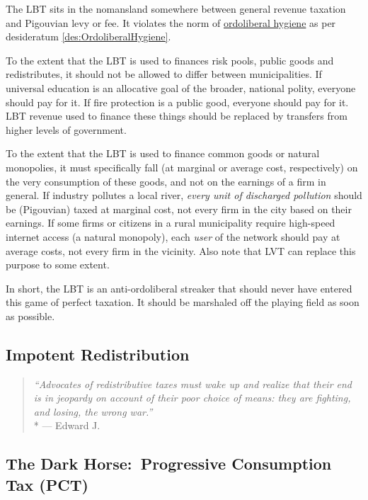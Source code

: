 The LBT sits in the nomansland somewhere between general revenue taxation and Pigouvian levy or fee.
It violates the norm of \hyperref[des:OrdoliberalHygiene]{ordoliberal hygiene} as per desideratum \ref{des:OrdoliberalHygiene}.

To the extent that the LBT is used to finances risk pools, public goods and redistributes, it should not be allowed to differ between municipalities.
If universal education is an allocative goal of the broader, national polity, everyone should pay for it.
If fire protection is a public good, everyone should pay for it.
LBT revenue used to finance these things should be replaced by transfers from higher levels of government.

To the extent that the LBT is used to finance common goods or natural monopolies, it must specifically fall (at marginal or average cost, respectively) on the very consumption of these goods, and not on the earnings of a firm in general.
If industry pollutes a local river, \emph{every unit of discharged pollution} should be (Pigouvian) taxed at marginal cost, not every firm in the city based on their earnings.
If some firms or citizens in a rural municipality require high-speed internet access (a natural monopoly), each \emph{user} of the network should pay at average costs, not every firm in the vicinity.
Also note that LVT can replace this purpose to some extent.

In short, the LBT is an anti-ordoliberal streaker that should never have entered this game of perfect taxation.
It should be marshaled off the playing field as soon as possible.

\subsection{Impotent Redistribution}

\begin{quote}
	\emph{``Advocates of redistributive taxes must wake up and realize that their end is in jeopardy on account of their poor choice of means:
	they are fighting, and losing, the wrong war.''}
	\\*
	--- Edward J.\ \citet[848]{McCaffery2005}
\end{quote}


\subsection[Progressive Consumption Tax]{The Dark Horse:~Progressive Consumption Tax (PCT)}
	\label{sec:ScorePCT}


